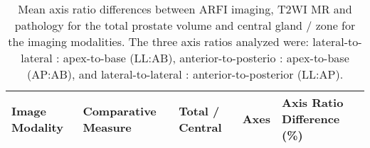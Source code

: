 \begin{table}
\centering
\caption{Mean axis ratio differences between ARFI imaging, T2WI MR and
    pathology for the total prostate volume and central gland / zone for the
    imaging modalities.  The three axis ratios analyzed were:
    lateral-to-lateral : apex-to-base (LL:AB), anterior-to-posterio :
    apex-to-base (AP:AB), and lateral-to-lateral : anterior-to-posterior
    (LL:AP).}
\begin{tabular}{|l|l|l|l|l|} \hline
{\bf Image Modality} & {\bf Comparative Measure} & {\bf Total / Central} & {\bf Axes} & {\bf Axis Ratio Difference (\%)} \\ \hline

\hline
\end{tabular}
\label{tab:axis_ratio_over_under}
\end{table}
